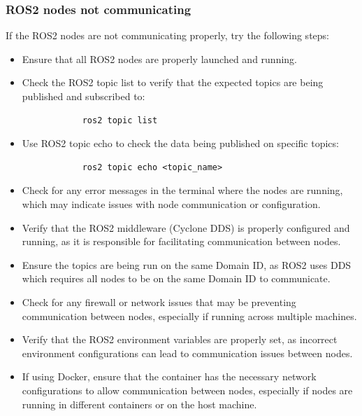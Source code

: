 \subsubsection{ROS2 nodes not communicating}
If the ROS2 nodes are not communicating properly, try the following steps:
\begin{itemize}
    \item Ensure that all ROS2 nodes are properly launched and running.
    \item Check the ROS2 topic list to verify that the expected topics are being published and subscribed to:
        \begin{verbatim}
            ros2 topic list
        \end{verbatim}
    \item Use ROS2 topic echo to check the data being published on specific topics:
        \begin{verbatim}
            ros2 topic echo <topic_name>
        \end{verbatim}
    \item Check for any error messages in the terminal where the nodes are running, which may indicate issues with node communication or configuration.
    \item Verify that the ROS2 middleware (Cyclone DDS) is properly configured and running, as it is responsible for facilitating communication between nodes.
    \item Ensure the topics are being run on the same Domain ID, as ROS2 uses DDS which requires all nodes to be on the same Domain ID to communicate.
    \item Check for any firewall or network issues that may be preventing communication between nodes, especially if running across multiple machines.
    \item Verify that the ROS2 environment variables are properly set, as incorrect environment configurations can lead to communication issues between nodes.
    \item If using Docker, ensure that the container has the necessary network configurations to allow communication between nodes, especially if nodes are running in different containers or on the host machine.
\end{itemize}

